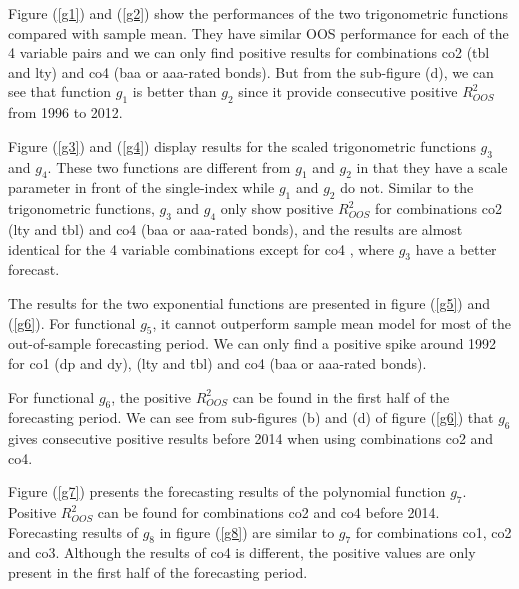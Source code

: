 \documentclass[a4paper,12pt,times,numbered,print,index]{report}
\numberwithin{equation}{section}
\begin{document}
	Figure (\ref{g1}) and (\ref{g2}) show the performances of the two trigonometric functions compared with sample mean. They have similar OOS performance for each of the 4 variable pairs and we can only find positive results for combinations co2 (tbl and lty) and co4 (baa or aaa-rated bonds). But from the sub-figure (d), we can see that function $g_1$ is better than $g_2$ since it provide consecutive positive $R^2_{OOS}$ from 1996 to 2012.
	
	Figure (\ref{g3}) and (\ref{g4}) display results for the scaled trigonometric functions $g_3$ and $g_4$. These two functions are different from $g_1$ and $g_2$ in that they have a scale parameter in front of the single-index while $g_1$ and $g_2$ do not. 
	Similar to the trigonometric functions, $g_3$ and $g_4$ only show positive $R^2_{OOS}$ for combinations co2 (lty and tbl) and co4 (baa or aaa-rated bonds), and the results are almost identical for the 4 variable combinations except for co4 , where $g_3$ have a better forecast.
	
	The results for the two exponential functions are presented in figure (\ref{g5}) and (\ref{g6}). For functional $g_5$, it cannot outperform sample mean model for most of the out-of-sample forecasting period. We can only find a positive spike around 1992 for co1 (dp and dy),  (lty and tbl) and co4 (baa or aaa-rated bonds). 
	
	For functional $g_6$, the positive $R^2_{OOS}$ can be found in the first half of the forecasting period. We can see from sub-figures (b) and (d) of figure (\ref{g6}) that $g_6$ gives consecutive positive results before 2014 when using combinations co2 and co4. 
	
	Figure (\ref{g7}) presents the forecasting results of the polynomial function $g_7$. Positive $R^2_{OOS}$ can be found for combinations co2 and co4 before 2014. Forecasting results of $g_8$ in figure (\ref{g8}) are similar to $g_7$ for combinations co1, co2 and co3. Although the results of co4 is different, the positive values are only present in the first half of the forecasting period. 
	
\end{document}
